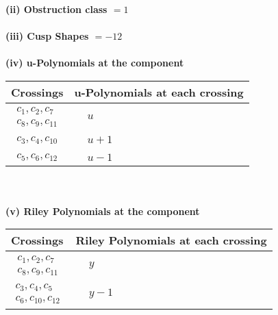 \documentclass[1p]{elsarticle_modified}
\theoremstyle{definition}
\begin{document}
\flushleft \textbf{(ii) Obstruction class $= 1$}\\~\\
\flushleft \textbf{(iii) Cusp Shapes $= -12$}\\~\\
\newpage\renewcommand{\arraystretch}{1}
\flushleft \textbf{(iv) u-Polynomials at the component}\newline \\
\begin{tabular}{m{50pt}|m{274pt}}
Crossings & \hspace{64pt}u-Polynomials at each crossing \\
\hline $$\begin{aligned}c_{1},c_{2},c_{7}\\c_{8},c_{9},c_{11}\end{aligned}$$&$\begin{aligned}
&u
\end{aligned}$\\
\hline $$\begin{aligned}c_{3},c_{4},c_{10}\end{aligned}$$&$\begin{aligned}
&u+1
\end{aligned}$\\
\hline $$\begin{aligned}c_{5},c_{6},c_{12}\end{aligned}$$&$\begin{aligned}
&u-1
\end{aligned}$\\
\hline
\end{tabular}\\~\\
\newpage\renewcommand{\arraystretch}{1}
\flushleft \textbf{(v) Riley Polynomials at the component}\newline \\
\begin{tabular}{m{50pt}|m{274pt}}
Crossings & \hspace{64pt}Riley Polynomials at each crossing \\
\hline $$\begin{aligned}c_{1},c_{2},c_{7}\\c_{8},c_{9},c_{11}\end{aligned}$$&$\begin{aligned}
&y
\end{aligned}$\\
\hline $$\begin{aligned}c_{3},c_{4},c_{5}\\c_{6},c_{10},c_{12}\end{aligned}$$&$\begin{aligned}
&y-1
\end{aligned}$\\
\hline
\end{tabular}\\~\\
\end{document}
